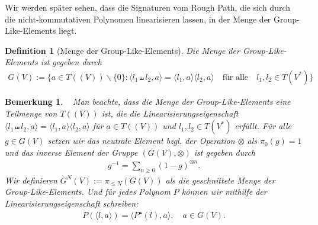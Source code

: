 \documentclass[12pt,titlepage,headsepline]{article}
\newtheorem{definition}{Definition}[section]
\newtheorem*{bemerkung*}{Bemerkung}
\begin{document}
      \hfill\break
      Wir werden später sehen, dass die Signaturen vom Rough Path, die sich durch die nicht-kommutativen Polynomen linearisieren lassen, in der Menge der Group-Like-Elements liegt.
      \begin{definition}[Menge der Group-Like-Elements]
        Die Menge der \textit{Group-Like-Elements} ist gegeben durch
        \begin{align*}
          G(V):=\{a \in T((V)) \backslash \{0\} : \langle l_1 \shuffle l_2,a \rangle = \langle l_1,a \rangle \langle l_2,a\rangle \quad \text{für alle} \quad l_1, l_2 \in T(V^*)\}
        \end{align*}
      \end{definition}

      \begin{bemerkung*}
        \
        \textup{
        Man beachte, dass die Menge der Group-Like-Elements eine Teilmenge von $T((V))$ ist, die die Linearisierungseigenschaft $\langle l_1 \shuffle l_2,a \rangle = \langle l_1,a \rangle \langle l_2,a\rangle$ für $a \in T((V))$ und $l_1, l_2 \in T(V^*)$ erfüllt. Für alle $g \in G(V)$ setzen wir das neutrale Element bzgl. der Operation $\otimes$ als $\pi_0(g) = 1$ und das inverse Element der Gruppe $(G(V),\otimes)$ ist gegeben durch
        \begin{align*}
          g^{-1}=\sum_{n\geq 0}(1-g)^{\otimes n}.
        \end{align*}
        Wir definieren $G^N(V):=\pi_{\leq N}(G(V))$ als die geschnittete Menge der Group-Like-Elements. Und für jedes Polynom $P$ können wir mithilfe der Linearisierungseigenschaft schreiben:
        \begin{align*}
          P(\langle l, a \rangle) = \langle P^{\shuffle}(l),a \rangle, \quad a \in G(V).
        \end{align*}
}
\end{bemerkung*}
\end{document}
